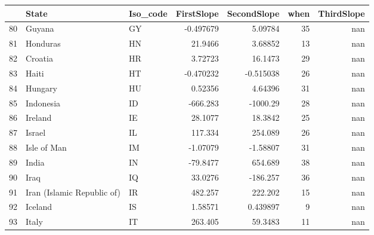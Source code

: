 \begin{tabular}{rllrrrr}
\hline
     & State                                          & Iso\_code   &     FirstSlope &    SecondSlope &   when &   ThirdSlope \\
\hline
  80 & Guyana                                         & GY         &   -0.497679    &     5.09784    &     35 &          nan \\
  81 & Honduras                                       & HN         &   21.9466      &     3.68852    &     13 &          nan \\
  82 & Croatia                                        & HR         &    3.72723     &    16.1473     &     29 &          nan \\
  83 & Haiti                                          & HT         &   -0.470232    &    -0.515038   &     26 &          nan \\
  84 & Hungary                                        & HU         &    0.52356     &     4.64396    &     31 &          nan \\
  85 & Indonesia                                      & ID         & -666.283       & -1000.29       &     28 &          nan \\
  86 & Ireland                                        & IE         &   28.1077      &    18.3842     &     25 &          nan \\
  87 & Israel                                         & IL         &  117.334       &   254.089      &     26 &          nan \\
  88 & Isle of Man                                    & IM         &   -1.07079     &    -1.58807    &     31 &          nan \\
  89 & India                                          & IN         &  -79.8477      &   654.689      &     38 &          nan \\
  90 & Iraq                                           & IQ         &   33.0276      &  -186.257      &     36 &          nan \\
  91 & Iran (Islamic Republic of)                     & IR         &  482.257       &   222.202      &     15 &          nan \\
  92 & Iceland                                        & IS         &    1.58571     &     0.439897   &      9 &          nan \\
  93 & Italy                                          & IT         &  263.405       &    59.3483     &     11 &          nan \\

\end{tabular}
